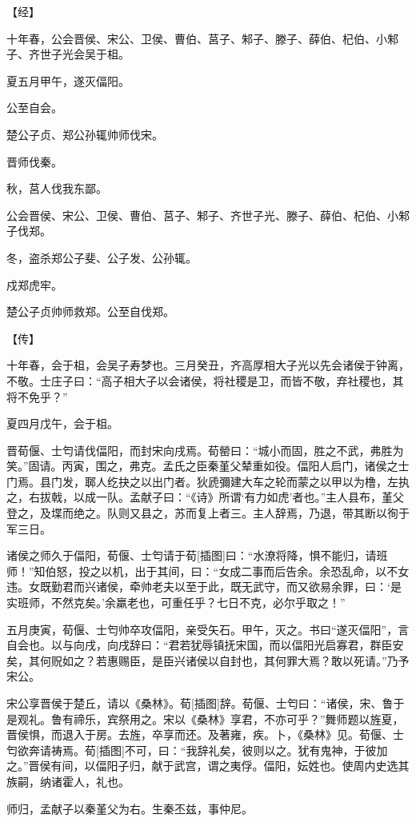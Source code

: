 \documentclass[a4paper,12pt,UTF8,twoside]{ctexbook}
\begin{document}
【经】

十年春，公会晋侯、宋公、卫侯、曹伯、莒子、邾子、滕子、薛伯、杞伯、小邾子、齐世子光会吴于柤。

夏五月甲午，遂灭偪阳。

公至自会。

楚公子贞、郑公孙辄帅师伐宋。

晋师伐秦。

秋，莒人伐我东鄙。

公会晋侯、宋公、卫侯、曹伯、莒子、邾子、齐世子光、滕子、薛伯、杞伯、小邾子伐郑。

冬，盗杀郑公子斐、公子发、公孙辄。

戍郑虎牢。

楚公子贞帅师救郑。公至自伐郑。

【传】

十年春，会于柤，会吴子寿梦也。三月癸丑，齐高厚相大子光以先会诸侯于钟离，不敬。士庄子曰：“高子相大子以会诸侯，将社稷是卫，而皆不敬，弃社稷也，其将不免乎？”

夏四月戊午，会于柤。

晋荀偃、士匄请伐偪阳，而封宋向戌焉。荀罃曰：“城小而固，胜之不武，弗胜为笑。”固请。丙寅，围之，弗克。孟氏之臣秦堇父辇重如役。偪阳人启门，诸侯之士门焉。县门发，郰人纥抉之以出门者。狄虒彌建大车之轮而蒙之以甲以为橹，左执之，右拔戟，以成一队。孟献子曰：“《诗》所谓‘有力如虎’者也。”主人县布，堇父登之，及堞而绝之。队则又县之，苏而复上者三。主人辞焉，乃退，带其断以徇于军三日。

诸侯之师久于偪阳，荀偃、士匄请于荀[插图]曰：“水潦将降，惧不能归，请班师！”知伯怒，投之以机，出于其间，曰：“女成二事而后告余。余恐乱命，以不女违。女既勤君而兴诸侯，牵帅老夫以至于此，既无武守，而又欲易余罪，曰：‘是实班师，不然克矣。’余羸老也，可重任乎？七日不克，必尔乎取之！”

五月庚寅，荀偃、士匄帅卒攻偪阳，亲受矢石。甲午，灭之。书曰“遂灭偪阳”，言自会也。以与向戌，向戌辞曰：“君若犹辱镇抚宋国，而以偪阳光启寡君，群臣安矣，其何贶如之？若惠赐臣，是臣兴诸侯以自封也，其何罪大焉？敢以死请。”乃予宋公。

宋公享晋侯于楚丘，请以《桑林》。荀[插图]辞。荀偃、士匄曰：“诸侯，宋、鲁于是观礼。鲁有禘乐，宾祭用之。宋以《桑林》享君，不亦可乎？”舞师题以旌夏，晋侯惧，而退入于房。去旌，卒享而还。及著雍，疾。卜，《桑林》见。荀偃、士匄欲奔请祷焉。荀[插图]不可，曰：“我辞礼矣，彼则以之。犹有鬼神，于彼加之。”晋侯有间，以偪阳子归，献于武宫，谓之夷俘。偪阳，妘姓也。使周内史选其族嗣，纳诸霍人，礼也。

师归，孟献子以秦堇父为右。生秦丕兹，事仲尼。
\end{document}
